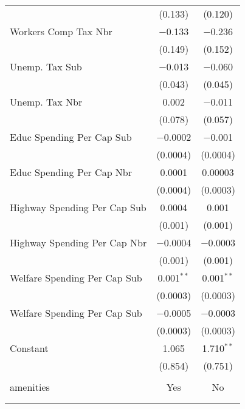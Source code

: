 \begin{table}[!htbp]
\begin{tabular}{@{\extracolsep{5pt}}lcc}
  & (0.133) & (0.120) \\ 
  Workers Comp Tax Nbr & $-$0.133 & $-$0.236 \\ 
  & (0.149) & (0.152) \\ 
  Unemp. Tax Sub & $-$0.013 & $-$0.060 \\ 
  & (0.043) & (0.045) \\ 
  Unemp. Tax Nbr & 0.002 & $-$0.011 \\ 
  & (0.078) & (0.057) \\ 
  Educ Spending Per Cap Sub & $-$0.0002 & $-$0.001 \\ 
  & (0.0004) & (0.0004) \\ 
  Educ Spending Per Cap Nbr & 0.0001 & 0.00003 \\ 
  & (0.0004) & (0.0003) \\ 
  Highway Spending Per Cap Sub & 0.0004 & 0.001 \\ 
  & (0.001) & (0.001) \\ 
  Highway Spending Per Cap Nbr & $-$0.0004 & $-$0.0003 \\ 
  & (0.001) & (0.001) \\ 
  Welfare Spending Per Cap Sub & 0.001$^{**}$ & 0.001$^{**}$ \\ 
  & (0.0003) & (0.0003) \\ 
  Welfare Spending Per Cap Sub & $-$0.0005 & $-$0.0003 \\ 
  & (0.0003) & (0.0003) \\ 
  Constant & 1.065 & 1.710$^{**}$ \\ 
  & (0.854) & (0.751) \\ 
 \hline \\[-1.8ex] 
amenities & Yes & No \\ 
\hline \\[-1.8ex] 
\hline 
\hline \\[-1.8ex] 
\end{tabular} 
\end{table} 
